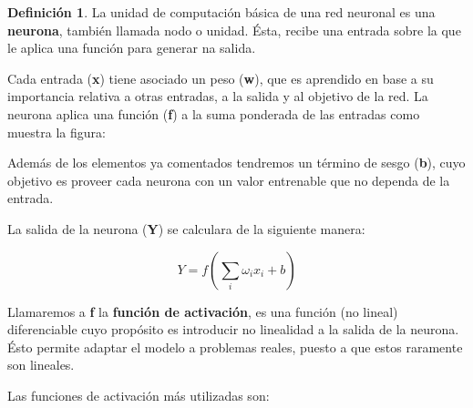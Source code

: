 \documentclass[12,twoside]{TFG-GM}
\theoremstyle{definition}
\newtheorem{definition}[theorem]{Definición}
\theoremstyle{remark}
\begin{document}
\begin{definition} 
La unidad de computación básica de una red neuronal es una \textbf{neurona}, también llamada nodo o unidad. Ésta, recibe una entrada sobre la que le aplica una función para generar na salida.
\end{definition}
Cada entrada (\textbf{x}) tiene asociado un peso (\textbf{w}), que es aprendido en base a su importancia relativa a otras entradas, a la salida y al objetivo de la red. La neurona  aplica una función (\textbf{f}) a la suma ponderada de las entradas como muestra la figura: 

Además de los elementos ya comentados tendremos un término de sesgo (\textbf{b}), cuyo objetivo es proveer cada neurona con un valor entrenable que no dependa de la entrada. 

La salida de la neurona (\textbf{Y}) se calculara de la siguiente manera: 

$$
Y = f \left(\sum_i \omega_i x_i + b \right) 
$$

Llamaremos a \textbf{f} la \textbf{función de activación}, es una función (no lineal) diferenciable cuyo propósito es introducir no linealidad a la salida de la neurona. Ésto permite adaptar el modelo a problemas reales, puesto a que estos raramente son lineales. 

Las funciones de activación más utilizadas son: 
\end{document}
